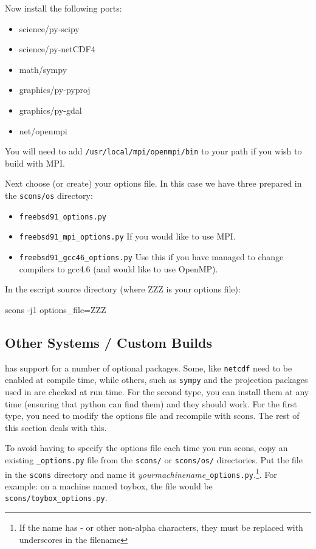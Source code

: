 Now install the following ports:
\begin{itemize}
 \item science/py-scipy
 \item science/py-netCDF4
 \item math/sympy
 \item graphics/py-pyproj
 \item graphics/py-gdal
 \item net/openmpi
\end{itemize}

You will need to add \texttt{/usr/local/mpi/openmpi/bin} to your path if you wish to build with MPI.

Next choose (or create) your options file.
In this case we have three prepared in the \texttt{scons/os} directory:
\begin{itemize}
 \item \texttt{freebsd91_options.py}
 \item \texttt{freebsd91_mpi_options.py}     If you would like to use MPI.
 \item \texttt{freebsd91_gcc46_options.py}   Use this if you have managed to change compilers to gcc4.6 (and would like to use OpenMP).
\end{itemize}

In the escript source directory (where ZZZ is your options file):
\begin{shellCode}
scons -j1 options_file=ZZZ
\end{shellCode}



\subsection{Other Systems / Custom Builds}\label{sec:othersrc}

\escript has support for a number of optional packages.
Some, like \texttt{netcdf} need to be enabled at compile time, while others, such as \texttt{sympy} and the projection packages
used in \downunder are checked at run time.
For the second type, you can install them at any time (ensuring that python can find them) and they should work.
For the first type, you need to modify the options file and recompile with scons.
The rest of this section deals with this.

To avoid having to specify the options file each time you run scons, copy an existing \texttt{_options.py} file from the 
\texttt{scons/} or \texttt{scons/os/} directories. Put the file in the \texttt{scons} directory and name 
it \textit{yourmachinename}\texttt{_options.py}.\footnote{If the name 
has - or other non-alpha characters, they must be replaced with underscores in the filename}.
For example: on a machine named toybox, the file would be \texttt{scons/toybox_options.py}.

